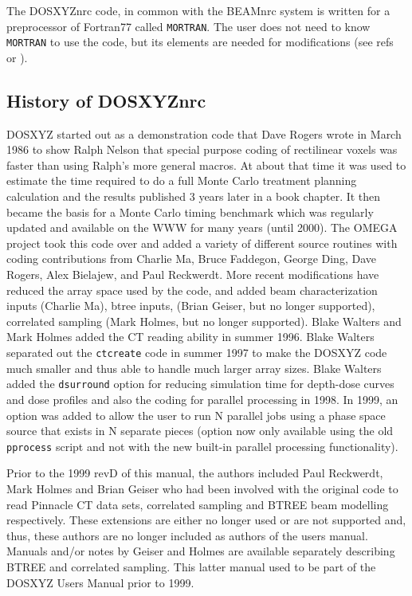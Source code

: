 \documentclass[12pt,twoside]{article}      %
\newcommand{\indexm}[1]{\index{#1}}
\begin{document}
The DOSXYZnrc code, in common with the BEAMnrc system is written for a
preprocessor of Fortran77 called {\tt MORTRAN}. The user does not need
to know {\tt MORTRAN} to use the code, but its elements are needed for
modifications (see refs~\cite{Ne85} or \cite{KR00}).

\subsection{History of DOSXYZnrc}

\indexm{history of DOSXYZnrc}

DOSXYZ started out as a demonstration code that Dave Rogers wrote in March
1986 to show Ralph Nelson that special purpose coding of rectilinear
voxels was faster than using Ralph's more general macros.  At about that time
it was used to estimate the time required to do a full Monte Carlo
treatment planning calculation and the results published 3 years later in
a book chapter\cite{RB90}.  It then became the basis for a Monte Carlo
timing benchmark\cite{BR92} which was regularly updated and available
on the WWW for many years (until 2000).
The OMEGA project took this code over and
added a variety of different source routines with coding contributions
from Charlie Ma, Bruce Faddegon, George Ding, Dave Rogers,  Alex Bielajew,
and Paul Reckwerdt.  More recent modifications have reduced the array
space used by the code, and added beam characterization inputs (Charlie
Ma), btree inputs, (Brian Geiser, but no longer supported), correlated
sampling (Mark Holmes, but no longer supported).
Blake Walters and Mark Holmes added the CT
reading ability in summer 1996.  Blake Walters separated out the
{\tt ctcreate} code in summer 1997 to make the DOSXYZ code much smaller and
thus
able to handle much larger array sizes.  Blake Walters added the
{\tt dsurround} option for reducing simulation time for depth-dose curves
and dose profiles and also the coding for parallel processing in 1998.
\indexm{ctcreate} In 1999, an option was added to allow the user to
run N parallel jobs using a phase space source that exists in N
separate pieces (option now only available using the old
{\tt pprocess} script and not with the new built-in parallel processing
functionality).

Prior to the 1999 revD of this manual, the authors included Paul
Reckwerdt, Mark Holmes and Brian Geiser who had been involved with the
original code to read Pinnacle CT data sets, correlated sampling and
BTREE beam modelling respectively.  These extensions are either no longer
used or are not supported and, thus, these authors are no longer included
as authors of the users manual.  Manuals and/or notes by Geiser and Holmes
are available separately describing BTREE\cite{Ge95} and
correlated sampling\cite{Ho99}.  This latter manual used to be part of
the DOSXYZ Users Manual prior to 1999.
\end{document}
